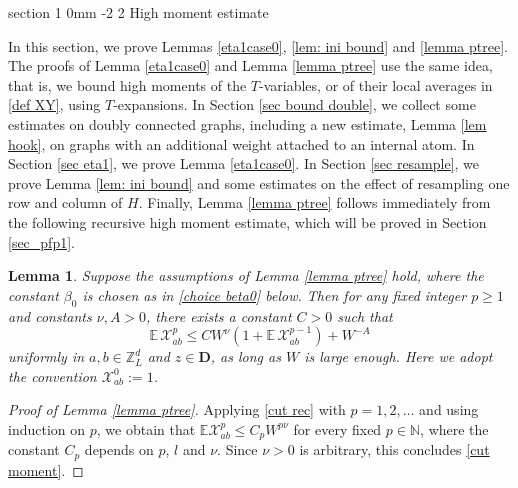 \documentclass{article}
\makeatletter
\newcommand{\1}{\mathds{1}}
\numberwithin{equation}{section}
\newcommand{\be}{\begin{equation}}
\newcommand{\ee}{\end{equation}}
\renewcommand{\cal}{\mathcal}
\renewcommand{\leq}{\leqslant}
\renewcommand{\geq}{\geqslant}
\renewcommand{\le}{\leq}
\renewcommand{\ge}{\geq}
\newcommand{\E}{\mathbb{E}}
\newcommand{\N}{\mathbb{N}}
\newcommand{\Z}{\mathbb{Z}}
\theoremstyle{plain} %
\newtheorem{lemma}[theorem]{Lemma}
\theoremstyle{remark}
\renewcommand{\section}{\@startsection
	{section}%
	{1}%
	{0mm}%
	{-2\baselineskip}%
	{2\baselineskip}%
	{\normalfont\large\scshape\centering}} %
\makeatother
\begin{document}
 
 

 



\section{High moment estimate}\label{sec ptree}

In this section, we prove Lemmas \ref{eta1case0}, \ref{lem: ini bound} and \ref{lemma ptree}. The proofs of Lemma \ref{eta1case0} and Lemma \ref{lemma ptree} use the same idea, that is, we bound high moments of the $T$-variables, or of their local averages in \eqref{def XY}, using $T$-expansions. In Section \ref{sec bound double}, we collect some estimates on doubly connected graphs, including a new estimate, Lemma \ref{lem hook}, on graphs with an additional weight attached to an internal atom. In Section \ref{sec eta1}, we prove Lemma \ref{eta1case0}. In Section \ref{sec resample}, we prove Lemma \ref{lem: ini bound} and some estimates on the effect of resampling one row and column of $H$. Finally, Lemma \ref{lemma ptree} follows immediately from the following recursive high moment estimate, which will be proved in Section \ref{sec_pfp1}.

\begin{lemma}\label{lem cutrec}
Suppose the assumptions of Lemma \ref{lemma ptree} hold, where the constant $\beta_0$ is chosen as in \eqref{choice beta0} below. Then for any fixed integer $p\ge 1$ and constants $\nu,A>0$, there exists a constant $C>0$ such that
\be\label{cut rec}
\E\, \cal X_{ab}^p \le C W^{\nu}\left(1+\E\, \cal X_{ab}^{p-1}\right)+W^{-A}
\ee
uniformly in $a,b\in \Z_L^d$ and $z\in \mathbf D$, as long as $W$ is large enough. Here we adopt the convention $\cal X_{ab}^0:=1$.
\end{lemma}

\begin{proof}[Proof of Lemma \ref{lemma ptree}]
Applying \eqref{cut rec} with $p=1,2,\ldots$ and using induction on $p$, we obtain that $\E \cal X_{ab}^p\le C_p W^{p\nu}$ for every fixed $p\in \N$, where the constant $C_p$ depends on $p$, $l$ and $\nu$. Since $\nu>0$ is arbitrary, this concludes \eqref{cut moment}.
\end{proof}
\end{document}
